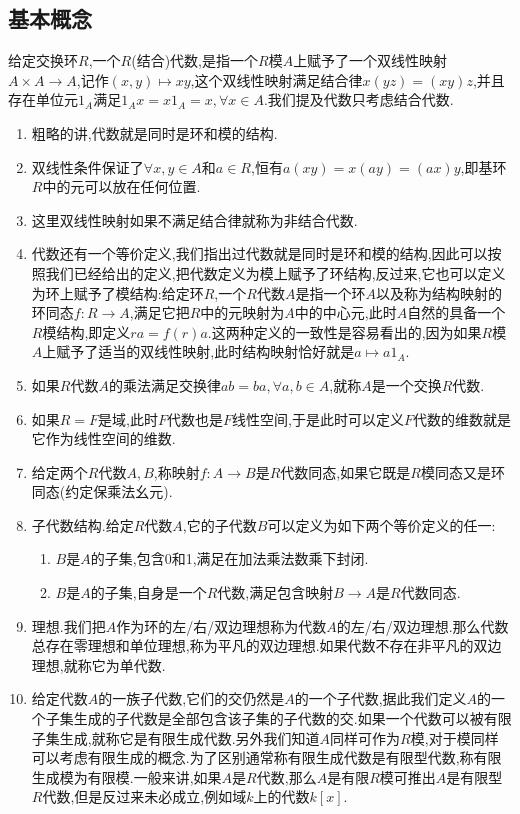 \subsection{基本概念}

给定交换环$R$,一个$R$(结合)代数,是指一个$R$模$A$上赋予了一个双线性映射$A\times A\to A$,记作$(x,y)\mapsto xy$,这个双线性映射满足结合律$x(yz)=(xy)z$,并且存在单位元$1_A$满足$1_Ax=x1_A=x,\forall x\in A$.我们提及代数只考虑结合代数.
\begin{enumerate}
	\item 粗略的讲,代数就是同时是环和模的结构.
	\item 双线性条件保证了$\forall x,y\in A$和$a\in R$,恒有$a(xy)=x(ay)=(ax)y$,即基环$R$中的元可以放在任何位置.
	\item 这里双线性映射如果不满足结合律就称为非结合代数.
	\item 代数还有一个等价定义,我们指出过代数就是同时是环和模的结构,因此可以按照我们已经给出的定义,把代数定义为模上赋予了环结构,反过来,它也可以定义为环上赋予了模结构:给定环$R$,一个$R$代数$A$是指一个环$A$以及称为结构映射的环同态$f:R\to A$,满足它把$R$中的元映射为$A$中的中心元,此时$A$自然的具备一个$R$模结构,即定义$ra=f(r)a$.这两种定义的一致性是容易看出的,因为如果$R$模$A$上赋予了适当的双线性映射,此时结构映射恰好就是$a\mapsto a1_A$.
	\item 如果$R$代数$A$的乘法满足交换律$ab=ba,\forall a,b\in A$,就称$A$是一个交换$R$代数.
	\item 如果$R=F$是域,此时$F$代数也是$F$线性空间,于是此时可以定义$F$代数的维数就是它作为线性空间的维数.
	\item 给定两个$R$代数$A,B$,称映射$f:A\to B$是$R$代数同态,如果它既是$R$模同态又是环同态(约定保乘法幺元).
	\item 子代数结构.给定$R$代数$A$,它的子代数$B$可以定义为如下两个等价定义的任一:
	\begin{enumerate}
		\item $B$是$A$的子集,包含0和1,满足在加法乘法数乘下封闭.
		\item $B$是$A$的子集,自身是一个$R$代数,满足包含映射$B\to A$是$R$代数同态.
	\end{enumerate}
	\item 理想.我们把$A$作为环的左/右/双边理想称为代数$A$的左/右/双边理想.那么代数总存在零理想和单位理想,称为平凡的双边理想.如果代数不存在非平凡的双边理想,就称它为单代数.
	\item 给定代数$A$的一族子代数,它们的交仍然是$A$的一个子代数,据此我们定义$A$的一个子集生成的子代数是全部包含该子集的子代数的交.如果一个代数可以被有限子集生成,就称它是有限生成代数.另外我们知道$A$同样可作为$R$模,对于模同样可以考虑有限生成的概念.为了区别通常称有限生成代数是有限型代数,称有限生成模为有限模.一般来讲,如果$A$是$R$代数,那么$A$是有限$R$模可推出$A$是有限型$R$代数,但是反过来未必成立,例如域$k$上的代数$k[x]$.
\end{enumerate}

